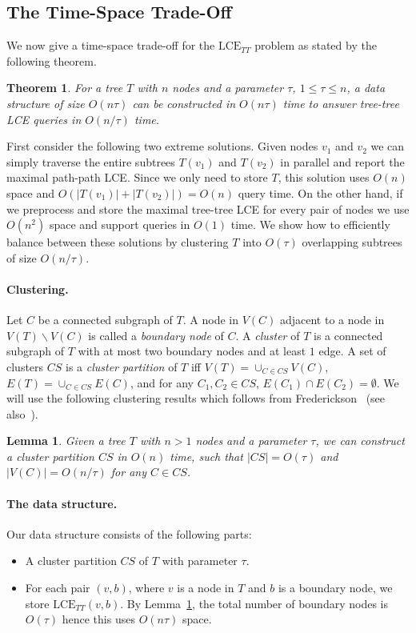 \documentclass [10pt]{article}
\newtheorem{lemma}{Lemma}
\newtheorem{theorem}{Theorem}
\newcommand{\LCETT}{\ensuremath{\mathrm{LCE}_{\mathit{TT}}}}
\begin{document}
\subsection{The Time-Space Trade-Off} 
We now give a time-space trade-off for the $\LCETT$ problem as stated by the following theorem. 

\begin{theorem}\label{thm:lcett}
For a tree $T$ with $n$ nodes and a parameter $\tau$, $1 \leq \tau \leq n$, a data structure of size $O(n\tau)$ can be constructed in $O(n\tau)$ time to answer tree-tree LCE queries in $O(n/\tau)$ time. 
\end{theorem}

First consider the following two extreme solutions. Given nodes $v_1$ and $v_2$ we can simply traverse the entire subtrees $T(v_1)$ and $T(v_2)$ in parallel and report the maximal path-path LCE. Since we only need to store $T$, this solution uses $O(n)$ space and $O(|T(v_1)| + |T(v_2)|) = O(n)$ query time. On the other hand, if we preprocess and store the maximal tree-tree LCE for every pair of nodes we use $O(n^2)$ space and support queries in $O(1)$ time. We show how to efficiently balance between these solutions by clustering $T$ into $O(\tau)$ overlapping subtrees of size $O(n/\tau)$.

\paragraph{Clustering.} 
Let $C$ be a connected subgraph of $T$. A node in $V(C)$ adjacent to a node in $V(T)\backslash V(C)$ is called a \emph{boundary node} of $C$. A \emph{cluster} of $T$ is a connected subgraph of $T$ with at most two boundary nodes and at least $1$ edge. A set of clusters $CS$ is a \emph{cluster partition} of $T$ iff $V(T) = \cup_{C \in CS} V(C)$, $E(T) = \cup_{C\in CS} E(C)$, and for any $C_1, C_2 \in CS$, $E(C_1) \cap E(C_2) = \emptyset$. We will use the following clustering results which follows from Frederickson~\cite{frederickson1997} (see also~\cite{AHLT1997, AHT2000, BG2011}).

\begin{lemma}\label{lem:clustering}
Given a tree $T$ with $n>1$ nodes and a parameter $\tau$, we can construct a cluster partition $CS$ in $O(n)$ time, such that $|CS| = O(\tau)$ and $|V(C)| = O({n/\tau})$ for any $C \in CS$. 
\end{lemma}

\paragraph{The data structure.}
Our data structure consists of the following parts: 
\begin{itemize} 
\item A cluster partition $CS$ of $T$ with parameter $\tau$.
\item For each pair $(v,b)$, where $v$ is a node in $T$ and $b$ is a boundary node, we store $\LCETT(v,b)$. By Lemma~\ref{lem:clustering}, the total number of boundary nodes is $O(\tau)$ hence this uses $O(n\tau)$ space. 
\end{itemize}
\end{document}
